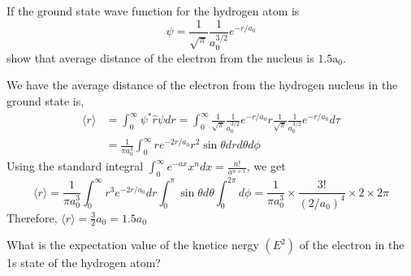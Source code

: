 \begin{exercise}
 If the ground state wave function for the hydrogen atom is
	$$
	\psi=\frac{1}{\sqrt{\pi}} \frac{1}{a_{0}^{3 / 2}} e^{-r / a_{0}}
	$$
	show that average distance of the electron from the nucleus is $1.5 \mathrm{a}_{0}$.
\end{exercise}
\begin{answer}
	We have the average distance of the electron from the hydrogen nucleus in the ground state is,
	$$
	\begin{aligned}
	\langle r\rangle &=\int_{0}^{\infty} \psi^{*} \hat{r} \psi d r=\int_{0}^{\infty} \frac{1}{\sqrt{\pi}} \frac{1}{a_{0}^{3 / 2}} e^{-r / a_{0}} r \frac{1}{\sqrt{\pi}} \frac{1}{a_{0}^{3 / 2}} e^{-r / a_{0}} d \tau \\
	&=\frac{1}{\pi a_{0}^{3}} \int_{0}^{\infty} r e^{-2 r / a_{0}} r^{2} \sin \theta d r d \theta d \phi
	\end{aligned}
	$$
	Using the standard integral $\int_{0}^{\infty} e^{-a x} x^{n} d x=\frac{n !}{a^{n+1}}$, we get
	$$
	\langle r\rangle=\frac{1}{\pi a_{0}^{3}} \int_{0}^{\infty} r^{3} e^{-2 r / a_{0}} d r \int_{0}^{\pi} \sin \theta d \theta \int_{0}^{2 \pi} d \phi=\frac{1}{\pi a_{0}^{3}} \times \frac{3 !}{\left(2 / a_{0}\right)^{4}} \times 2 \times 2 \pi
	$$
	Therefore, $\langle r\rangle=\frac{3}{2} a_{0}=1.5 a_{0}$
\end{answer}
\begin{exercise}
	 What is the expectation value of the knetice nergy $\left(E^{2}\right)$ of the electron in the 1s state of the hydrogen atom?
\end{exercise}
